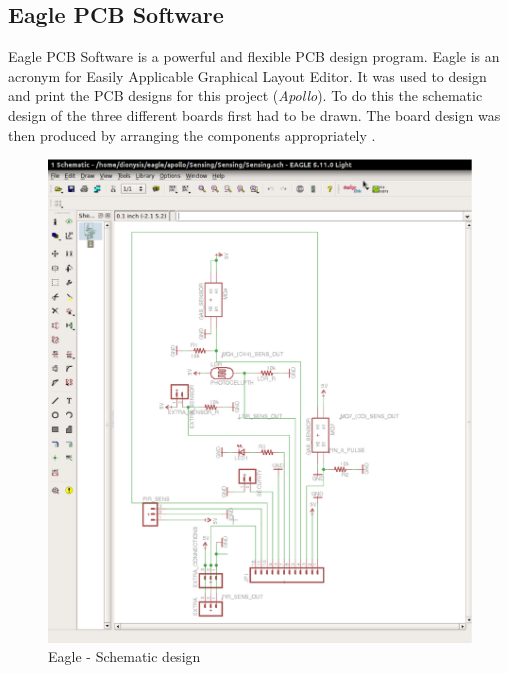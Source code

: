\documentclass[12pt,a4paper]{report}
\begin{document}
\subsection{Eagle PCB Software}
Eagle PCB Software is a powerful and flexible PCB design program. Eagle is an acronym for Easily Applicable Graphical Layout Editor. It was used to design and print the PCB designs for this project (\emph{Apollo}). To do this the schematic design of the three different boards first had to be drawn. The board design was then produced by arranging the components appropriately \cite{website:eagle}.
\begin{figure}[H]
\centering
    \includegraphics*[scale=0.25]{eagle1}
    \caption{Eagle - Schematic design}
\end{figure}
\end{document}
